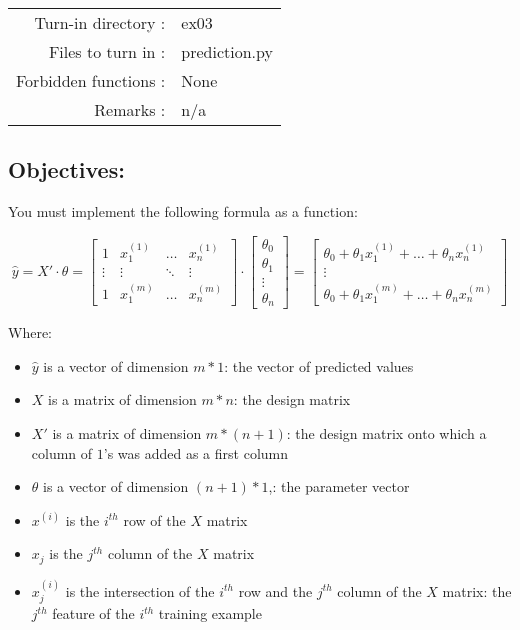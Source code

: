 \documentclass[]{article}
\begin{document}
\begin{longtable}[]{@{}rl@{}}
\toprule
\endhead
Turn-in directory : & ex03\tabularnewline
Files to turn in : & prediction.py\tabularnewline
Forbidden functions : & None\tabularnewline
Remarks : & n/a\tabularnewline
\bottomrule
\end{longtable}

\hypertarget{objectives-2}{%
\subsection{Objectives:}\label{objectives-2}}

You must implement the following formula as a function:

\large

\[
\hat{y} = X' \cdot \theta = 
\begin{bmatrix} 
1 & x_{1}^{(1)} & \dots & x_{n}^{(1)}\\
\vdots & \vdots & \ddots & \vdots\\
1 & x_{1}^{(m)} & \dots &  x_{n}^{(m)}\end{bmatrix}
\cdot
\begin{bmatrix}
\theta_0 \\ 
\theta_1 \\
\vdots \\
\theta_n
\end{bmatrix} 
= 
\begin{bmatrix} 
\theta_0 + \theta_{1} x_{1}^{(1)} + \dots + \theta_{n} x_{n}^{(1)}\\ 
\vdots \\ 
\theta_0 + \theta_{1} x_{1}^{(m)} + \dots + \theta_{n} x_{n}^{(m)}
\end{bmatrix}
\] \normalsize

Where:

\begin{itemize}
\item
  \(\hat{y}\) is a vector of dimension \(m * 1\): the vector of
  predicted values
\item
  \(X\) is a matrix of dimension \(m * n\): the design matrix
\item
  \(X'\) is a matrix of dimension \(m * (n + 1)\): the design matrix
  onto which a column of \(1\)'s was added as a first column
\item
  \(\theta\) is a vector of dimension \((n + 1) * 1\),: the parameter
  vector
\item
  \(x^{(i)}\) is the \(i^{th}\) row of the \(X\) matrix
\item
  \(x_{j}\) is the \(j^{th}\) column of the \(X\) matrix
\item
  \(x_j^{(i)}\) is the intersection of the \(i^{th}\) row and the
  \(j^{th}\) column of the \(X\) matrix: the \(j^{th}\) feature of the
  \(i^{th}\) training example
\end{itemize}
\end{document}
